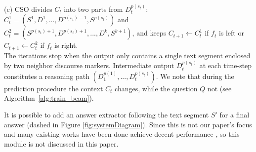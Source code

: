 (c) CSO divides $C_t$ into two parts from $D^{p(s_t)}_t$: $C^1_t=(S^1, D^1,...,D^{p(s_t)-1}, S^{p(s_t)})$ and $C^2_t=(S^{p(s_t)+1}, D^{p(s_t)+1},...,D^k, S^{k+1})$, and keeps $C_{t+1} \leftarrow C_{t}^{1}$ if $f_t$ is left or $C_{t+1} \leftarrow C_{t}^{2}$ if $f_t$ is right. \\
The iterations stop when the output only contains a single text segment enclosed by two neighbor discourse markers. Intermediate output $D^{p(s_t)}_t$ at each time-step constitutes a reasoning path $(D^{p(1)}_1,...,D^{p(s_t)}_t)$. We note that during the prediction procedure the context $C_t$ changes, while the question $Q$ not (see Algorithm~\ref{alg:train_beam}).

It is possible to add an answer extractor following the text segment $S'$ for a final answer (dashed in Figure \ref{fig:systemDiagram}). Since this is not our paper's focus and many existing works have been done achieve decent performance \cite{DBLP:conf/ijcai/HuPHQW018}, so this module is not discussed in this paper. %





